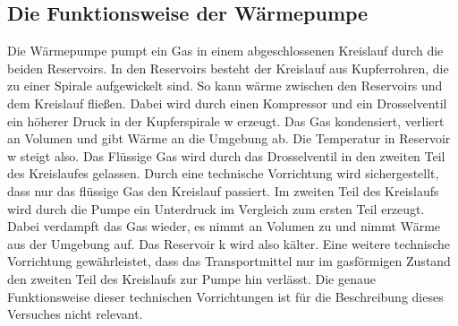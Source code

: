\subsection{Die Funktionsweise der Wärmepumpe \cite[vgl.][]{man:v206}} %
\label{sec:funktionsweise}
Die Wärmepumpe pumpt ein Gas in einem abgeschlossenen Kreislauf durch die beiden Reservoirs.
In den Reservoirs besteht der Kreislauf aus Kupferrohren, die zu einer Spirale aufgewickelt sind.
So kann wärme zwischen den Reservoirs und dem Kreislauf fließen.
Dabei wird durch einen Kompressor und ein Drosselventil ein höherer Druck in der Kupferspirale w erzeugt.
Das Gas kondensiert,  verliert an Volumen und gibt Wärme an die Umgebung ab.
Die Temperatur in Reservoir w steigt also. 
Das Flüssige Gas wird durch das Drosselventil in den zweiten Teil des Kreislaufes gelassen.
Durch eine technische Vorrichtung wird sichergestellt, dass nur das flüssige Gas den Kreislauf passiert.
Im zweiten Teil des Kreislaufs wird durch die Pumpe ein Unterdruck im Vergleich zum ersten Teil erzeugt.
Dabei verdampft das Gas wieder, es nimmt an Volumen zu und nimmt Wärme aus der Umgebung auf.
Das Reservoir k wird also kälter.
Eine weitere technische Vorrichtung gewährleistet, dass das Transportmittel nur im gasförmigen Zustand 
den zweiten Teil des Kreislaufs zur Pumpe hin verlässt.
Die genaue Funktionsweise dieser technischen Vorrichtungen ist für die Beschreibung dieses Versuches nicht relevant.
